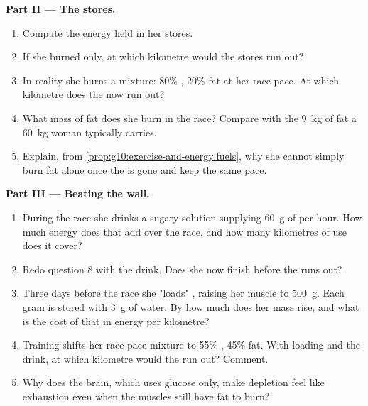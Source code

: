 \begin{problem}
\medskip
\noindent\textbf{Part II --- The stores.}
\begin{enumerate}[resume]
  \item Compute the energy held in her  stores.
  \item If she burned  only, at which kilometre would the
        stores run out?
  \item In reality she burns a mixture: 80\% , 20\% fat
        at her race pace. At which kilometre does the  now
        run out?
  \item What mass of fat does she burn in the race? Compare with the
        \qty{9}{kg} of fat a \qty{60}{kg} woman typically carries.
  \item Explain, from \cref{prop:g10:exercise-and-energy:fuels}, why
        she cannot simply burn fat alone once the  is gone and
        keep the same pace.
\end{enumerate}

\medskip
\noindent\textbf{Part III --- Beating the wall.}
\begin{enumerate}[resume]
  \item During the race she drinks a sugary solution supplying
        \qty{60}{g} of  per hour. How much energy does
        that add over the race, and how many kilometres of
         use does it cover?
  \item Redo question 8 with the drink. Does she now finish before
        the  runs out?
  \item Three days before the race she "loads" , raising
        her muscle  to \qty{500}{g}. Each gram is stored with
        \qty{3}{g} of water. By how much does her mass rise, and what
        is the cost of that in energy per kilometre?
  \item Training shifts her race-pace mixture to 55\% ,
        45\% fat. With loading and the drink, at which kilometre
        would the  run out? Comment.
  \item Why does the brain, which uses glucose only, make 
        depletion feel like exhaustion even when the muscles still
        have fat to burn?
\end{enumerate}


\end{problem}
